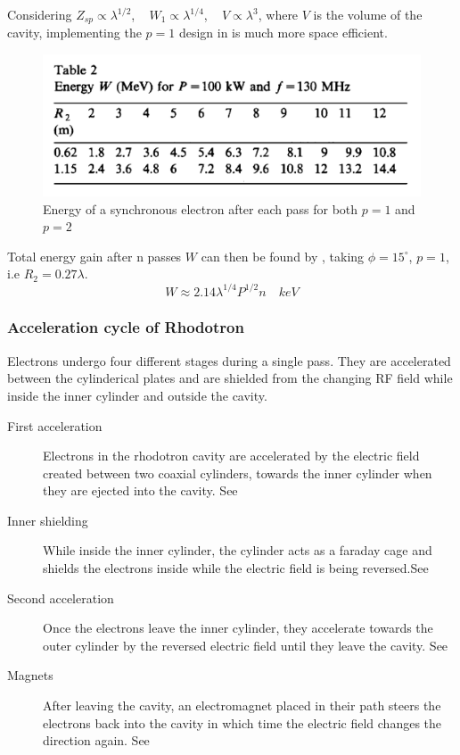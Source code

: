 \documentclass[a4paper,oneside,12pt]{report}
\numberwithin{equation}{chapter}
\begin{document}
Considering $Z_{sp} \propto \lambda^{1/2}$, \,\,\, $W_1 \propto \lambda^{1/4}$, \,\,\,   $V \propto \lambda^3$, where $V$ is the volume of the cavity, implementing the $p=1$ design in  is much more space efficient.
\begin{figure}[H]
    \centering
    \includegraphics[width=.9\textwidth]{./figures/pottier_table2.png}
    \caption{Energy of a synchronous electron after each pass for both $p=1$ and $p=2$ \cite{rhodo_pottier}}
    \label{fig:pottier_table2}
\end{figure}
Total energy gain after n passes $W$ can then be found by , taking $\phi = 15^\circ$, $p=1$, i.e $R_2 = 0.27 \lambda$.
\begin{equation}
    \label{eq:W_total_gain_pottier}
    W \approx 2.14 \lambda^{1/4} P^{1/2} n \quad keV
\end{equation}

\subsubsection{Acceleration cycle of Rhodotron}

Electrons undergo four different stages during a single pass. 
They are accelerated between the cylinderical plates and are shielded from the changing RF field while inside the inner cylinder and outside the cavity. 

\begin{description}
    \item[First acceleration] Electrons in the rhodotron cavity are accelerated by the electric field created between two coaxial cylinders, towards the inner cylinder when they are ejected into the cavity. See 
    \item[Inner shielding] While inside the inner cylinder, the cylinder acts as a faraday cage and shields the electrons inside while the electric field is being reversed.See 
    \item[Second acceleration] Once the electrons leave the inner cylinder, they accelerate towards the outer cylinder by the reversed electric field until they leave the cavity. See 
    \item[Magnets] After leaving the cavity, an electromagnet placed in their path steers the electrons back into the cavity in which time the electric field changes the direction again. See 
\end{description}
\end{document}
